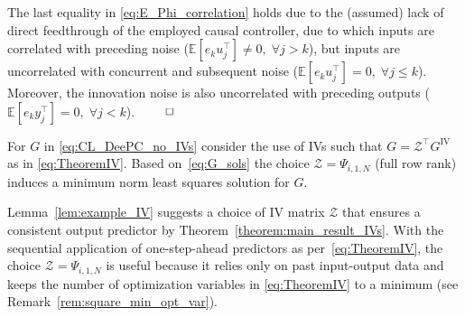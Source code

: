 The last equality in \eqref{eq:E_Phi_correlation} holds due to the (assumed) lack of direct feedthrough of the employed causal controller, due to which inputs are correlated with preceding noise (${\mathbb{E}[e_k u_j^\top]\neq0,\; \forall j>k}$), but inputs are uncorrelated with concurrent and subsequent noise (${\mathbb{E}[e_k u_j^\top]=0,\; \forall j\leq k}$). Moreover, the innovation noise is also uncorrelated with preceding outputs (${\mathbb{E}[e_k y_j^\top]=0,\; \forall j<k}$). $\hfill \qed$
\setcounter{thm}{1}
\begin{rem}
    For $G$ in \eqref{eq:CL_DeePC_no_IVs} consider the use of \ac{IVs} such that $G=\mathcal{Z}^\top G^\mathrm{IV}$ as in \eqref{eq:TheoremIV}. Based on~\eqref{eq:G_sols} the choice $\mathcal{Z}=\Psi_{i,1,N}$ (full row rank) induces a minimum norm least squares solution for $G$.
\end{rem}

Lemma~\ref{lem:example_IV} suggests a choice of \acs{IV} matrix $\mathcal{Z}$ that ensures a consistent output predictor by Theorem~\ref{theorem:main_result_IVs}. With the sequential application of one-step-ahead predictors as per~\eqref{eq:TheoremIV}, the choice $\mathcal{Z}=\Psi_{i,1,N}$ is useful because it relies only on past input-output data and keeps the number of optimization variables in \eqref{eq:TheoremIV} to a minimum (see Remark~\ref{rem:square_min_opt_var}).

